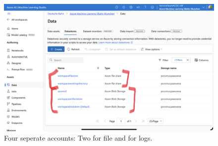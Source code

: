 \begin{figure}[H]
	\centering
	\includegraphics[scale = 0.1]{attachment/chapter_10/Scc036}
	\caption{Four seperate accounts: Two for file and for logs.}
\end{figure}

